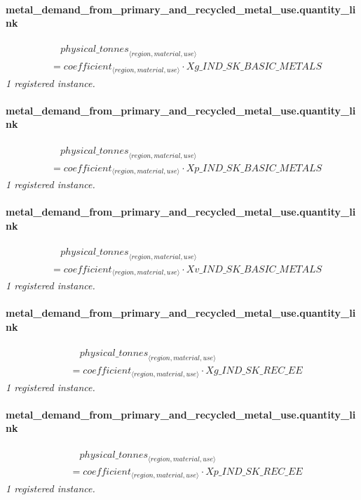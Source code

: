 \documentclass[11pt]{article}
\begin{document}
\paragraph{metal\_demand\_from\_primary\_and\_recycled\_metal\_use.quantity\_link}
\begin{align*}
&\quad {physical\_tonnes}_{\langle region, material, use\rangle}\\
&= coefficient_{\langle region, material, use\rangle} \cdot Xg\_IND\_SK\_BASIC\_METALS
\end{align*}
\noindent\emph{1 registered instance.}\par
\paragraph{metal\_demand\_from\_primary\_and\_recycled\_metal\_use.quantity\_link}
\begin{align*}
&\quad {physical\_tonnes}_{\langle region, material, use\rangle}\\
&= coefficient_{\langle region, material, use\rangle} \cdot Xp\_IND\_SK\_BASIC\_METALS
\end{align*}
\noindent\emph{1 registered instance.}\par
\paragraph{metal\_demand\_from\_primary\_and\_recycled\_metal\_use.quantity\_link}
\begin{align*}
&\quad {physical\_tonnes}_{\langle region, material, use\rangle}\\
&= coefficient_{\langle region, material, use\rangle} \cdot Xv\_IND\_SK\_BASIC\_METALS
\end{align*}
\noindent\emph{1 registered instance.}\par
\paragraph{metal\_demand\_from\_primary\_and\_recycled\_metal\_use.quantity\_link}
\begin{align*}
&\quad {physical\_tonnes}_{\langle region, material, use\rangle}\\
&= coefficient_{\langle region, material, use\rangle} \cdot Xg\_IND\_SK\_REC\_EE
\end{align*}
\noindent\emph{1 registered instance.}\par
\paragraph{metal\_demand\_from\_primary\_and\_recycled\_metal\_use.quantity\_link}
\begin{align*}
&\quad {physical\_tonnes}_{\langle region, material, use\rangle}\\
&= coefficient_{\langle region, material, use\rangle} \cdot Xp\_IND\_SK\_REC\_EE
\end{align*}
\noindent\emph{1 registered instance.}\par
\end{document}
